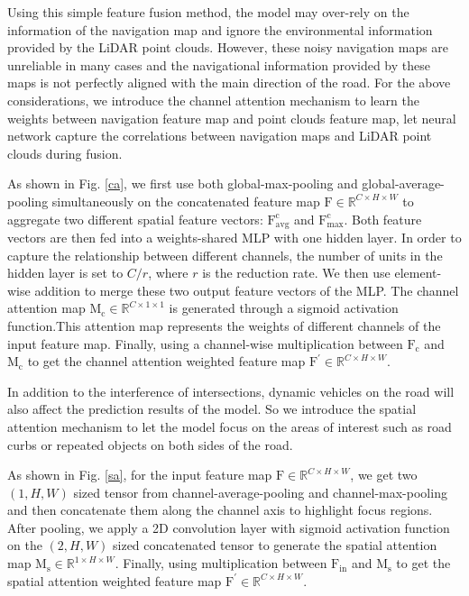 \documentclass[letterpaper,10 pt,conference]{ieeeconf}  %
\begin{document}
Using this simple feature fusion method, the model may over-rely on the information of the navigation map and ignore the environmental information provided by the LiDAR point clouds. However, these noisy navigation maps are unreliable in many cases and the navigational information provided by these maps is not perfectly aligned with the main direction of the road. For the above considerations, we introduce the channel attention mechanism to learn the weights between navigation feature map and point clouds feature map, let neural network 
capture the correlations between navigation maps and LiDAR point clouds during fusion.

As shown in Fig. \ref{ca}, we first use both global-max-pooling and global-average-pooling simultaneously on the concatenated feature map $\mathrm{F}\in \mathbb{R}^{C\times H\times W}$ to aggregate two different spatial feature vectors: $\mathrm{F^{c}_{avg}}$ and $\mathrm{F^{c}_{max}}$. Both feature vectors are then fed into a weights-shared MLP with one hidden layer. In order to capture the relationship between different channels, the number of units in the hidden layer is set to $C/r$, where $r$ is the reduction rate. We then use element-wise addition to merge these two output feature vectors of the MLP. The channel attention map $\mathrm{M_c}\in \mathbb{R}^{C\times 1\times 1}$ is generated through a sigmoid activation function.This attention map represents the weights of different channels of the input feature map. Finally, using a channel-wise multiplication between $\mathrm{F_{c}}$ and $\mathrm{M_c}$ to get the channel attention weighted feature map $\mathrm{F^{\prime}}\in \mathbb{R}^{C\times H\times W}$.

In addition to the interference of intersections, dynamic vehicles on the road will also affect the prediction results of the model. So we introduce the spatial attention mechanism to let the model focus on the areas of interest such as road curbs or repeated objects on both sides of the road.

As shown in Fig. \ref{sa}, for the input feature map $\mathrm{F}\in \mathbb{R}^{C\times H\times W}$, we get two $(1, H, W)$ sized tensor from channel-average-pooling and channel-max-pooling and then concatenate them along the channel axis to highlight focus regions. After pooling, we apply a 2D convolution layer with sigmoid activation function on the $(2, H, W)$ sized concatenated tensor to generate the spatial attention map $\mathrm{M_s}\in \mathbb{R}^{1\times H\times W}$. Finally, using multiplication between $\mathrm{F_{in}}$ and $\mathrm{M_s}$ to get the spatial attention weighted feature map $\mathrm{F^{\prime}}\in \mathbb{R}^{C\times H\times W}$.
\end{document}
